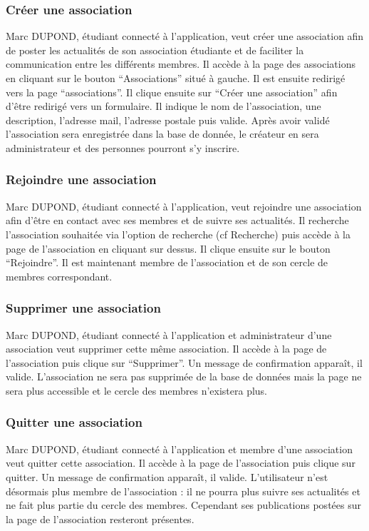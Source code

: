 \subsubsection*{Créer une association}
Marc DUPOND, étudiant connecté à l’application, veut créer une association afin de poster les actualités de son association étudiante et de faciliter la communication entre les différents membres. Il accède à la page des associations en cliquant sur le bouton “Associations” situé à gauche. Il est ensuite redirigé vers la page “associations”. Il clique ensuite sur “Créer une association” afin d’être redirigé vers un formulaire. Il indique le nom de l’association, une description, l’adresse mail, l’adresse postale puis valide. Après avoir validé l’association sera enregistrée dans la base de donnée, le créateur en sera administrateur et des personnes pourront s’y inscrire.
\subsubsection*{Rejoindre une association}
Marc DUPOND, étudiant connecté à l’application, veut rejoindre une association afin d’être en contact avec ses membres et de suivre ses actualités. Il recherche l’association souhaitée via l’option de recherche (cf Recherche) puis accède à la page de l’association en cliquant sur dessus. Il clique ensuite sur le bouton “Rejoindre”. Il est maintenant membre de l’association et de son cercle de membres correspondant.
\subsubsection*{Supprimer une association}
Marc DUPOND, étudiant connecté à l’application et administrateur d’une association veut supprimer cette même association. Il accède à la page de l’association puis clique sur “Supprimer”. Un message de confirmation apparaît, il valide. L’association ne sera pas supprimée de la base de données mais la page ne sera plus accessible et le cercle des membres n’existera plus.
\subsubsection*{Quitter une association}
Marc DUPOND, étudiant connecté à l’application et membre d’une association veut quitter cette association. Il accède à la page de l’association puis clique sur quitter. Un message de confirmation apparaît, il valide. L'utilisateur n’est désormais plus membre de l’association : il ne pourra plus suivre ses actualités et ne fait plus partie du cercle des membres. Cependant ses publications postées sur la page de l’association resteront présentes.
